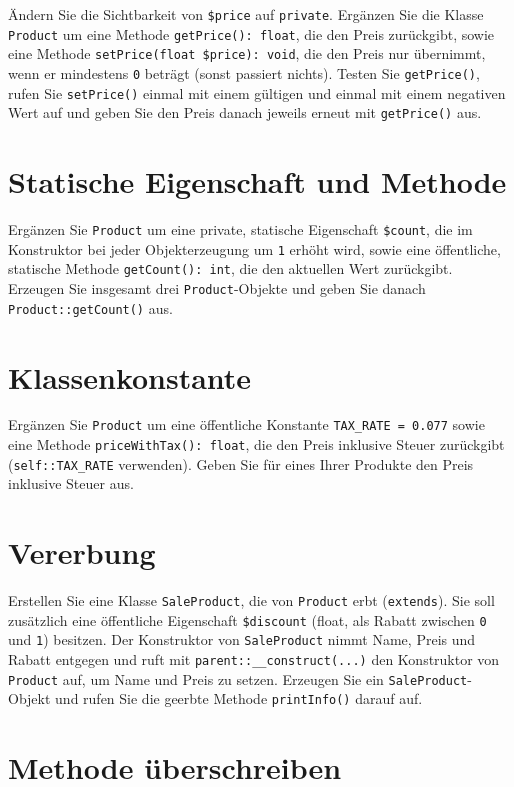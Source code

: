 \documentclass[a4paper,12pt]{article}
\begin{document}
Ändern Sie die Sichtbarkeit von \texttt{\$price} auf \texttt{private}. Ergänzen Sie die Klasse \texttt{Product} um eine Methode \texttt{getPrice(): float}, die den Preis zurückgibt, sowie eine Methode \texttt{setPrice(float \$price): void}, die den Preis nur übernimmt, wenn er mindestens \texttt{0} beträgt (sonst passiert nichts). Testen Sie \texttt{getPrice()}, rufen Sie \texttt{setPrice()} einmal mit einem gültigen und einmal mit einem negativen Wert auf und geben Sie den Preis danach jeweils erneut mit \texttt{getPrice()} aus.

\section{Statische Eigenschaft und Methode}

Ergänzen Sie \texttt{Product} um eine private, statische Eigenschaft \texttt{\$count}, die im Konstruktor bei jeder Objekterzeugung um \texttt{1} erhöht wird, sowie eine öffentliche, statische Methode \texttt{getCount(): int}, die den aktuellen Wert zurückgibt. Erzeugen Sie insgesamt drei \texttt{Product}-Objekte und geben Sie danach \texttt{Product::getCount()} aus.

\section{Klassenkonstante}

Ergänzen Sie \texttt{Product} um eine öffentliche Konstante \texttt{TAX\_RATE = 0.077} sowie eine Methode \texttt{priceWithTax(): float}, die den Preis inklusive Steuer zurückgibt (\texttt{self::TAX\_RATE} verwenden). Geben Sie für eines Ihrer Produkte den Preis inklusive Steuer aus.

\section{Vererbung}

Erstellen Sie eine Klasse \texttt{SaleProduct}, die von \texttt{Product} erbt (\texttt{extends}). Sie soll zusätzlich eine öffentliche Eigenschaft \texttt{\$discount} (float, als Rabatt zwischen \texttt{0} und \texttt{1}) besitzen. Der Konstruktor von \texttt{SaleProduct} nimmt Name, Preis und Rabatt entgegen und ruft mit \texttt{parent::\_\_construct(...)} den Konstruktor von \texttt{Product} auf, um Name und Preis zu setzen. Erzeugen Sie ein \texttt{SaleProduct}-Objekt und rufen Sie die geerbte Methode \texttt{printInfo()} darauf auf.

\section{Methode überschreiben}
\end{document}
